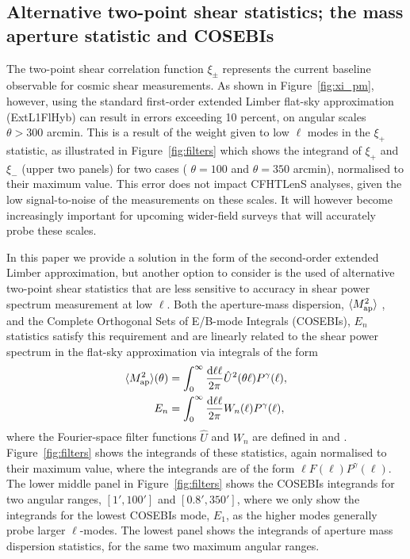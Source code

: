 \subsection{Alternative two-point shear statistics; the mass aperture statistic and COSEBIs}

The two-point shear correlation function $\xi_\pm$ represents the current
baseline observable for cosmic shear measurements.   As shown in
Figure~\ref{fig:xi_pm}, however, using the standard first-order extended
Limber flat-sky approximation (ExtL1FlHyb) can result in errors exceeding 10
percent, on angular scales $\theta > 300$ arcmin.    This is a result of the
weight given to low $\ell$ modes in the $\xi_+$ statistic, as
illustrated in Figure~\ref{fig:filters} which shows the integrand of $\xi_+$
and $\xi_-$ (upper two panels) for two cases ( $\theta = 100$ and $\theta =
350$ arcmin), normalised to their maximum value.   This error does not impact
CFHTLenS analyses, given the low signal-to-noise of the measurements on these
scales.  It will however become increasingly important for upcoming wider-field
surveys that will accurately probe these scales.

In this paper we provide a solution in the form of the second-order extended
Limber approximation, but another option to consider is the used of alternative two-point
shear statistics that are less sensitive to accuracy in shear power spectrum
measurement at low $\ell$.   Both the aperture-mass dispersion, $\langle M_
{\rm ap}^2 \rangle$ \citep{1998MNRAS.296..873S}, and the Complete Orthogonal
Sets of E/B-mode Integrals (COSEBIs), $E_n$ \citep{COSEBIs} statistics satisfy
this requirement and are linearly related to the shear power spectrum in the
flat-sky approximation via integrals of the form 
%
\begin{align}
  \langle M_ {\rm ap}^2 \rangle(\theta) & = \int_0^{\infty}\frac{{\rm d} \ell \ell}{2\pi}
  \hat U^2(\theta\ell) P^\gamma(\ell),
  \label{eqn:integ}
  \\
  E_n & = \int_0^{\infty}\frac{{\rm d} \ell \ell}{2\pi} W_n(\ell) P^\gamma(\ell),
\end{align}
%
where the Fourier-space filter functions $\hat U$ and $W_n$ are defined in
\cite{1998MNRAS.296..873S} and \cite{COSEBIs}. 
Figure~\ref{fig:filters} shows the integrands of these statistics, again normalised to their maximum
value, where the integrands are of the form $\ell F(\ell) P^\gamma(\ell)$.  
The lower middle panel in Figure~\ref{fig:filters} shows the
COSEBIs integrands for two angular ranges, $[1',100']$ and $[0.8',350']$, where
we only show the integrands for the lowest COSEBIs mode, $E_1$, as the higher
modes generally probe larger $\ell$-modes.  The lowest panel shows the
integrands of aperture mass dispersion statistics, for the same two maximum
angular ranges. 

